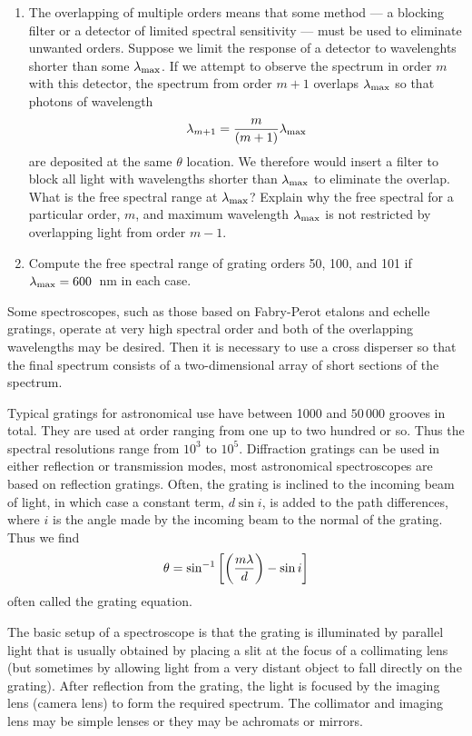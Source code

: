 \documentclass{article}
\begin{document}
\begin{enumerate}
\item The overlapping of multiple orders means that some method --- a
  blocking filter or a detector of limited spectral sensitivity ---
  must be used to eliminate unwanted orders. Suppose we limit
  the response of a detector to wavelenghts shorter than some
  $\lambda_{\rm max}$. If we attempt to observe the spectrum in order
  $m$ with this detector, the spectrum from order $m+1$ overlaps
  $\lambda_{\rm max}$ so that photons of wavelength 
\[
\lambda_{m+1}=\frac{m}{(m+1)}\lambda_{\rm max}
\]
are deposited at the same $\theta$ location. We therefore would insert
a filter to block all light with wavelengths shorter than
$\lambda_{\rm max}$ to eliminate the overlap. What is the free spectral range at
  $\lambda_{\rm max}$? Explain why the free spectral for a particular
  order, $m$, and maximum wavelength $\lambda_{\rm max}$ is not
  restricted by overlapping light from order $m-1$.
\item Compute the free spectral range of grating orders 50, 100, and
  101 if $\lambda_{\rm max}=600$~nm in each case.
\setcounter{count}{\value{enumi}} 
\end{enumerate}

Some spectroscopes, such as those based on Fabry-Perot etalons and echelle gratings, 
operate at very high spectral order and both of the overlapping wavelengths may be
desired. Then it is necessary to use a cross disperser so that the final spectrum 
consists of a two-dimensional array of short sections of the spectrum.

Typical gratings for astronomical use have between 1000 and $50\,000$ grooves in total.
They are used at order ranging from one up to two hundred or so. Thus the spectral 
resolutions range from $10^3$ to $10^5$. Diffraction gratings can be used in either 
reflection or transmission modes, most astronomical spectroscopes are based on reflection gratings. Often, the grating is inclined to the incoming beam of light, in which
case a constant term, $d\sin i$, is added to the path differences, where $i$ is the angle
made by the incoming beam to the normal of the grating. Thus we find
\[
\theta=\sin^{-1}\left[\left({m\lambda\over d}\right)-\sin i\right]
\]
often called the grating equation.

The basic setup of a spectroscope is that the grating is illuminated by parallel light
that is usually obtained by placing a slit at the focus of a collimating lens (but sometimes by allowing light from a very distant object to fall directly on the grating).
After reflection from the grating, the light is focused by the imaging lens (camera lens)
to form the required spectrum. The collimator and imaging lens may be simple lenses or they may be achromats or mirrors.
\end{document}
